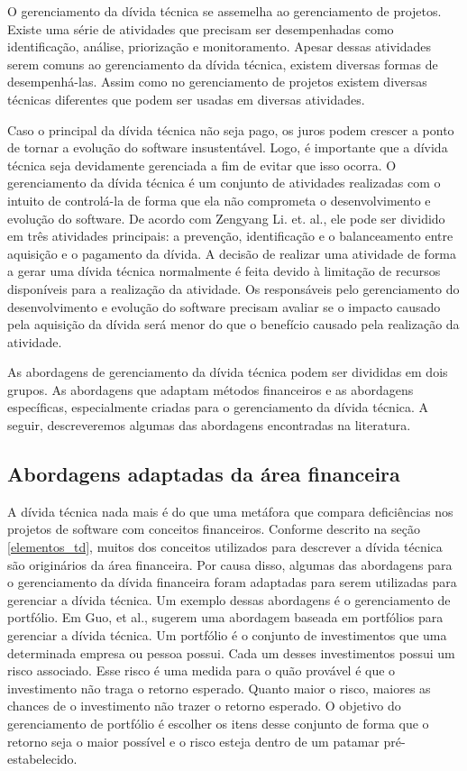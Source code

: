 O gerenciamento da dívida técnica se assemelha ao gerenciamento de projetos. Existe uma série de atividades que precisam ser desempenhadas como identificação, análise, priorização e monitoramento. Apesar dessas atividades serem comuns ao gerenciamento da dívida técnica, existem diversas formas de desempenhá-las. Assim como no gerenciamento de projetos existem diversas técnicas diferentes que podem ser usadas em diversas atividades.

Caso o principal da dívida técnica não seja pago, os juros podem crescer a ponto de tornar a evolução do software insustentável. Logo, é importante que a dívida técnica seja devidamente gerenciada a fim de evitar que isso ocorra\cite{power2013understanding}. O gerenciamento da dívida técnica é um conjunto de atividades realizadas com o intuito de controlá-la de forma que ela não comprometa o desenvolvimento e evolução do software. De acordo com Zengyang Li. et. al.\cite{li2015systematic}, ele pode ser dividido em três atividades principais: a prevenção, identificação e o balanceamento entre aquisição e o pagamento da dívida.  A decisão de realizar uma atividade de forma a gerar uma dívida técnica normalmente é feita devido à limitação de recursos disponíveis para a realização da atividade.  Os responsáveis pelo gerenciamento do desenvolvimento e evolução do software precisam avaliar se o impacto causado pela aquisição da dívida será menor do que o benefício causado pela realização da atividade.  
 
As abordagens de gerenciamento da dívida técnica podem ser divididas em dois grupos. As abordagens que adaptam métodos financeiros e as abordagens específicas, especialmente criadas para o gerenciamento da dívida técnica. A seguir, descreveremos algumas das abordagens encontradas na literatura.


\subsection{Abordagens adaptadas da área financeira}

 A dívida técnica nada mais é do que uma metáfora que compara deficiências nos projetos de software com conceitos financeiros. Conforme descrito na seção \ref{elementos_td}, muitos dos conceitos utilizados para descrever a dívida técnica são originários da área financeira. Por causa disso, algumas das abordagens para o gerenciamento da dívida financeira foram adaptadas para serem utilizadas para gerenciar a dívida técnica. Um exemplo dessas abordagens é o gerenciamento de portfólio.  Em \cite{guo2011portfolio} Guo, et al., sugerem uma abordagem baseada em portfólios para gerenciar a dívida técnica. Um portfólio é o conjunto de investimentos que uma determinada empresa ou pessoa possui. Cada um desses investimentos possui um risco associado. Esse risco é uma medida para o quão provável é que o investimento não traga o retorno esperado. Quanto maior o risco, maiores as chances de o investimento não trazer o retorno esperado. O objetivo do gerenciamento de portfólio é escolher os itens desse conjunto de forma que o retorno seja o maior possível e o risco esteja dentro de um patamar pré-estabelecido. 


